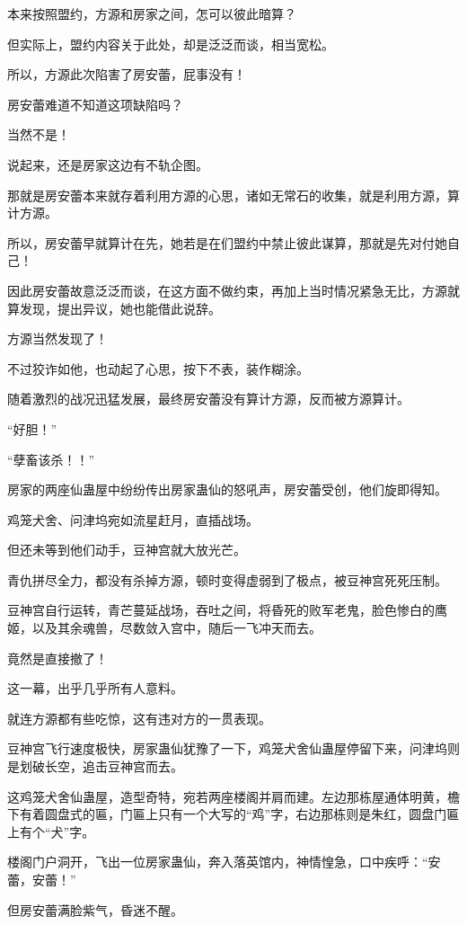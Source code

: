 \begin{this_body}
本来按照盟约，方源和房家之间，怎可以彼此暗算？

但实际上，盟约内容关于此处，却是泛泛而谈，相当宽松。

所以，方源此次陷害了房安蕾，屁事没有！

房安蕾难道不知道这项缺陷吗？

当然不是！

说起来，还是房家这边有不轨企图。

那就是房安蕾本来就存着利用方源的心思，诸如无常石的收集，就是利用方源，算计方源。

所以，房安蕾早就算计在先，她若是在们盟约中禁止彼此谋算，那就是先对付她自己！

因此房安蕾故意泛泛而谈，在这方面不做约束，再加上当时情况紧急无比，方源就算发现，提出异议，她也能借此说辞。

方源当然发现了！

不过狡诈如他，也动起了心思，按下不表，装作糊涂。

随着激烈的战况迅猛发展，最终房安蕾没有算计方源，反而被方源算计。

“好胆！”

“孽畜该杀！！”

房家的两座仙蛊屋中纷纷传出房家蛊仙的怒吼声，房安蕾受创，他们旋即得知。

鸡笼犬舍、问津坞宛如流星赶月，直插战场。

但还未等到他们动手，豆神宫就大放光芒。

青仇拼尽全力，都没有杀掉方源，顿时变得虚弱到了极点，被豆神宫死死压制。

豆神宫自行运转，青芒蔓延战场，吞吐之间，将昏死的败军老鬼，脸色惨白的鹰姬，以及其余魂兽，尽数敛入宫中，随后一飞冲天而去。

竟然是直接撤了！

这一幕，出乎几乎所有人意料。

就连方源都有些吃惊，这有违对方的一贯表现。

豆神宫飞行速度极快，房家蛊仙犹豫了一下，鸡笼犬舍仙蛊屋停留下来，问津坞则是划破长空，追击豆神宫而去。

这鸡笼犬舍仙蛊屋，造型奇特，宛若两座楼阁并肩而建。左边那栋屋通体明黄，檐下有着圆盘式的匾，门匾上只有一个大写的“鸡”字，右边那栋则是朱红，圆盘门匾上有个“犬”字。

楼阁门户洞开，飞出一位房家蛊仙，奔入落英馆内，神情惶急，口中疾呼：“安蕾，安蕾！”

但房安蕾满脸紫气，昏迷不醒。


\end{this_body}
